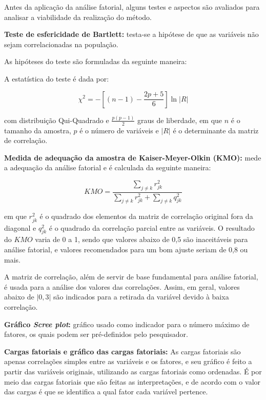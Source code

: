 \documentclass[
]{estat/estat}
\begin{document}
Antes da aplicação da análise fatorial, alguns testes e aspectos são
avaliados para analisar a viabilidade da realização do método.

\textbf{Teste de esfericidade de Bartlett:} testa-se a hipótese de que
as variáveis não sejam correlacionadas na população.

As hipóteses do teste são formuladas da seguinte maneira:


A estatística do teste é dada por:

\[
\chi^2 = -\left[(n-1) - \frac{2p + 5}{6}\right] \ln |R|
\]

com distribuição Qui-Quadrado e \(\frac{p(p-1)}{2}\) graus de liberdade,
em que \(n\) é o tamanho da amostra, \(p\) é o número de variáveis e
\(|R|\) é o determinante da matriz de correlação.

\textbf{Medida de adequação da amostra de Kaiser-Meyer-Olkin (KMO):}
mede a adequação da análise fatorial e é calculada da seguinte maneira:

\[
KMO = \frac{\sum_{j \neq k} r_{jk}^2}{\sum_{j \neq k} r_{jk}^2 + \sum_{j \neq k} q_{jk}^2}
\]

em que \(r_{jk}^2\) é o quadrado dos elementos da matriz de correlação
original fora da diagonal e \(q_{jk}^2\) é o quadrado da correlação
parcial entre as variáveis. O resultado do \(KMO\) varia de 0 a 1, sendo
que valores abaixo de 0,5 são inaceitáveis para análise fatorial, e
valores recomendados para um bom ajuste seriam de 0,8 ou mais.

A matriz de correlação, além de servir de base fundamental para análise
fatorial, é usada para a análise dos valores das correlações. Assim, em
geral, valores abaixo de \(|0,3|\) são indicados para a retirada da
variável devido à baixa correlação.

\textbf{Gráfico \emph{Scree plot}:} gráfico usado como indicador para o
número máximo de fatores, os quais podem ser pré-definidos pelo
pesquisador.

\textbf{Cargas fatoriais e gráfico das cargas fatoriais:} As cargas
fatoriais são apenas correlações simples entre as variáveis e os
fatores, e seu gráfico é feito a partir das variáveis originais,
utilizando as cargas fatoriais como ordenadas. É por meio das cargas
fatoriais que são feitas as interpretações, e de acordo com o valor das
cargas é que se identifica a qual fator cada variável pertence.
\end{document}
